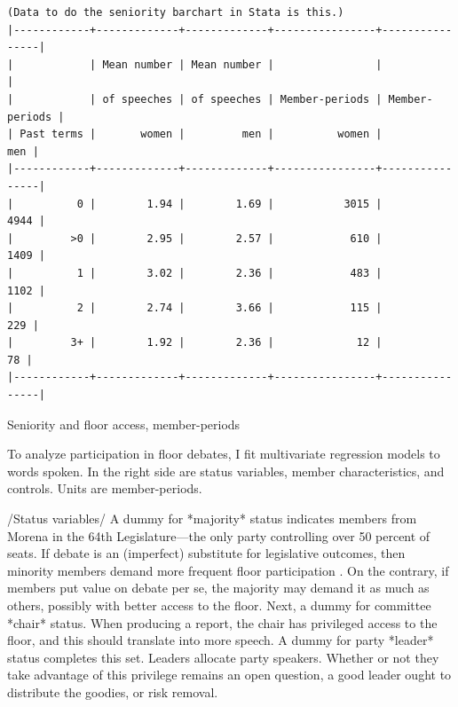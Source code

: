 \documentclass[letter,12pt]{article}
\begin{document}
\begin{table}
  \begin{scriptsize}
    \begin{verbatim}
(Data to do the seniority barchart in Stata is this.)
|------------+-------------+-------------+----------------+----------------|
|            | Mean number | Mean number |                |                |
|            | of speeches | of speeches | Member-periods | Member-periods |
| Past terms |       women |         men |          women |            men |
|------------+-------------+-------------+----------------+----------------|
|          0 |        1.94 |        1.69 |           3015 |           4944 |
|         >0 |        2.95 |        2.57 |            610 |           1409 |
|          1 |        3.02 |        2.36 |            483 |           1102 |
|          2 |        2.74 |        3.66 |            115 |            229 |
|         3+ |        1.92 |        2.36 |             12 |             78 |
|------------+-------------+-------------+----------------+----------------|
    \end{verbatim}
  \end{scriptsize}
\caption{Seniority and floor access, member-periods}
\end{table}
  
To analyze participation in floor debates, I fit multivariate regression models to words spoken. In the right side are status variables, member characteristics, and controls. Units are member-periods. 

/Status variables/ A dummy for *majority* status indicates members from Morena in the 64th Legislature---the only party controlling over 50 percent of seats. If debate is an (imperfect) substitute for legislative outcomes, then minority members demand more frequent floor participation \citep{proksch-slapin2015book}. On the contrary, if members put value on debate per se, the majority may demand it as much as others, possibly with better access to the floor. Next, a dummy for committee *chair* status. When producing a report, the chair has privileged access to the floor, and this should translate into more speech. A dummy for party *leader* status completes this set. Leaders allocate party speakers. Whether or not they take advantage of this privilege remains an open question, a good leader ought to distribute the goodies, or risk removal. 
\end{document}
